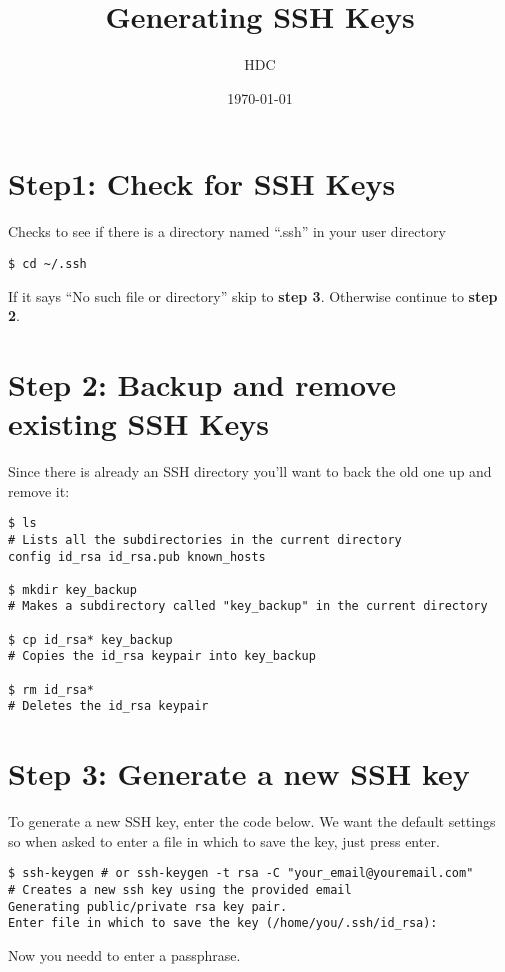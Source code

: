 \documentclass[11pt]{article}
\title{Generating SSH Keys}
\author{HDC}
\date{\today}
\begin{document}
\maketitle

\setcounter{tocdepth}{3}
\tableofcontents
\vspace*{1cm}

\section{Step1: Check for SSH Keys}
\label{sec-1}

Checks to see if there is a directory named ``.ssh'' in your user directory

\begin{verbatim}
$ cd ~/.ssh
\end{verbatim}
If it says ``No such file or directory'' skip to \textbf{step 3}. Otherwise continue to \textbf{step 2}.
\section{Step 2: Backup and remove existing SSH Keys}
\label{sec-2}

Since there is already an SSH directory you'll want to back the old one up and remove it:

\begin{verbatim}
$ ls
# Lists all the subdirectories in the current directory
config id_rsa id_rsa.pub known_hosts

$ mkdir key_backup
# Makes a subdirectory called "key_backup" in the current directory

$ cp id_rsa* key_backup
# Copies the id_rsa keypair into key_backup

$ rm id_rsa*
# Deletes the id_rsa keypair
\end{verbatim}
\section{Step 3: Generate a new SSH key}
\label{sec-3}

To generate a new SSH key, enter the code below. We want the default settings so when asked to enter a file in which to save the key, just press enter.

\begin{verbatim}
$ ssh-keygen # or ssh-keygen -t rsa -C "your_email@youremail.com"
# Creates a new ssh key using the provided email
Generating public/private rsa key pair.
Enter file in which to save the key (/home/you/.ssh/id_rsa):
\end{verbatim}
Now you needd to enter a passphrase.
\end{document}
